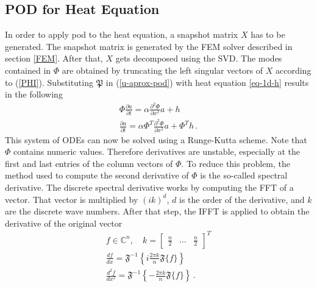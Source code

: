 \subsection{POD for Heat Equation}
In order to apply pod to the heat equation, a snapshot matrix \(X\) has to be generated.
The snapshot matrix is generated by the FEM solver described in section \ref{FEM}.
After that, \(X\) gets decomposed using the SVD.
The modes contained in \(\Phi\) are obtained by truncating the left singular vectors of \(X\) according to (\ref{PHI}).
Substituting \(\mathfrak{P}\) in (\ref{u-aprox-pod}) with heat equation \ref{eq-1d-h} results in the following
\begin{gather}
\Phi \frac{\partial a}{\partial t}  = \alpha \frac{\partial^{2} \Phi}{\partial x^{2}} a + h\\
\frac{\partial a}{\partial t} = \alpha \Phi^{T}  \frac{\partial^{2} \Phi}{\partial x^{2}} a + \Phi^{T}h \,.
\end{gather}
This system of ODEs can now be solved using a Runge-Kutta scheme.
Note that \(\Phi\) contains numeric values.
Therefore derivatives are unstable, especially at the first and last entries of the column vectors of \(\Phi\).
To reduce this problem, the method used to compute the second derivative of \(\Phi\) is the so-called spectral derivative.
The discrete spectral derivative works by computing the FFT of a vector.
That vector is multiplied by \((ik)^{d}\), \(d\) is the order of the derivative, and \(k\) are the discrete wave numbers.
After that step, the IFFT is applied to obtain the derivative of the original vector \cite{brunton_kutz_2019f}
\begin{gather}
f \in \mathbb{C}^{n}, \quad k = \begin{bmatrix}
\frac{n}{2} & \hdots & \frac{n}{2}
\end{bmatrix}^{T} \\
\frac{df}{dx} = \mathfrak{F}^{-1}\left\{i \frac{2 \pi k}{n} \mathfrak{F}\{f\}\right\} \\
\frac{d^{2}f}{dx^{2}} = \mathfrak{F}^{-1}\left\{-\frac{2 \pi k}{n} \mathfrak{F}\{f\}\right\} \,.
\end{gather}


